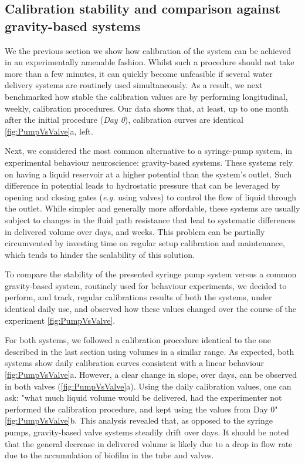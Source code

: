 \subsection*{Calibration stability and comparison against gravity-based systems}

We the previous section we show how calibration of the system can be achieved in an experimentally amenable fashion. Whilst such a procedure should not take more than a few minutes, it can quickly become unfeasible if several water delivery systems are routinely used simultaneously. As a result, we next benchmarked how stable the calibration values are by performing longitudinal, weekly, calibration procedures. Our data shows that, at least, up to one month after the initial procedure (\textit{Day 0}), calibration curves are identical \ref{fig:PumpVsValve}a, left.

Next, we considered the most common alternative to a syringe-pump system, in experimental behaviour neuroscience: gravity-based systems. These systems rely on having a liquid reservoir at a higher potential than the system's outlet. Such difference in potential leads to hydrostatic pressure that can be leveraged by opening and closing gates (\textit{e.g.} using valves) to control the flow of liquid through the outlet. While simpler and generally more affordable, these systems are usually subject to changes in the fluid path resistance that lead to systematic differences in delivered volume over days, and weeks. This problem can be partially circumvented by investing time on regular setup calibration and maintenance, which tends to hinder the scalability of this solution.

To compare the stability of the presented syringe pump system versus a common gravity-based system, routinely used for behaviour experiments, we decided to perform, and track, regular calibrations results of both the systems, under identical daily use, and observed how these values changed over the course of the experiment \ref{fig:PumpVsValve}.

For both systems, we followed a calibration procedure identical to the one described in the last section using volumes in a similar range. As expected, both systems show daily calibration curves consistent with a linear behaviour \ref{fig:PumpVsValve}a. However, a clear change in slope, over days, can be observed in both valves (\ref{fig:PumpVsValve}a). Using the daily calibration values, one can ask: "what much liquid volume would be delivered, had the experimenter not performed the calibration procedure, and kept using the values from Day 0" \ref{fig:PumpVsValve}b. This analysis revealed that, as opposed to the syringe pumps, gravity-based valve systems steadily drift over days. It should be noted that the general decrease in delivered volume is likely due to a drop in flow rate due to the accumulation of biofilm in the tube and valves. 

